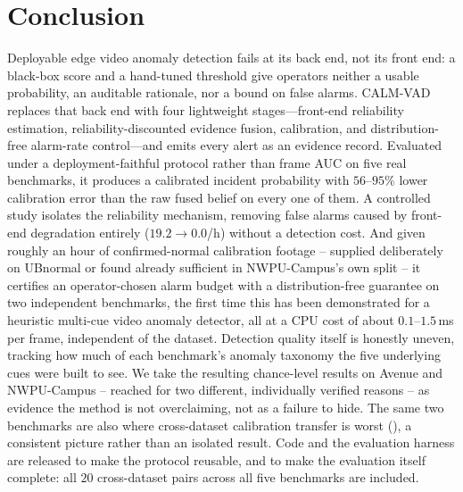 \documentclass[conference]{IEEEtran}
\newcommand{\method}{CALM-VAD}
\begin{document}
\section{Conclusion}

Deployable edge video anomaly detection fails at its back end, not its front
end: a black-box score and a hand-tuned threshold give operators neither a
usable probability, an auditable rationale, nor a bound on false alarms.
\method{} replaces that back end with four lightweight stages---front-end
reliability estimation, reliability-discounted evidence fusion, calibration,
and distribution-free alarm-rate control---and emits every alert as an
evidence record. Evaluated under a deployment-faithful protocol rather than
frame AUC on five real benchmarks, it produces a calibrated incident
probability with $56$--$95\%$ lower calibration error than the raw fused
belief on every one of them. A controlled study isolates the reliability
mechanism, removing false alarms caused by front-end degradation entirely
($19.2\to0.0$/h) without a detection cost. And given roughly an hour of
confirmed-normal calibration footage -- supplied deliberately on UBnormal or
found already sufficient in NWPU-Campus's own split -- it certifies an
operator-chosen alarm budget with a distribution-free guarantee on two
independent benchmarks, the first time this has been demonstrated for a
heuristic multi-cue video anomaly detector, all at a CPU cost of about
$0.1$--$1.5$\,ms per frame, independent of the dataset. Detection quality
itself is honestly uneven, tracking how much of each benchmark's anomaly
taxonomy the five underlying cues were built to see. We take the resulting
chance-level results on Avenue and NWPU-Campus -- reached for two different,
individually verified reasons -- as evidence the method is not overclaiming,
not as a failure to hide. The same two benchmarks are also where
cross-dataset calibration transfer is worst (), a consistent
picture rather than an isolated result. Code and the evaluation harness are
released to make the protocol reusable, and to make the evaluation itself
complete: all $20$ cross-dataset pairs across all five benchmarks are
included.



\end{document}
